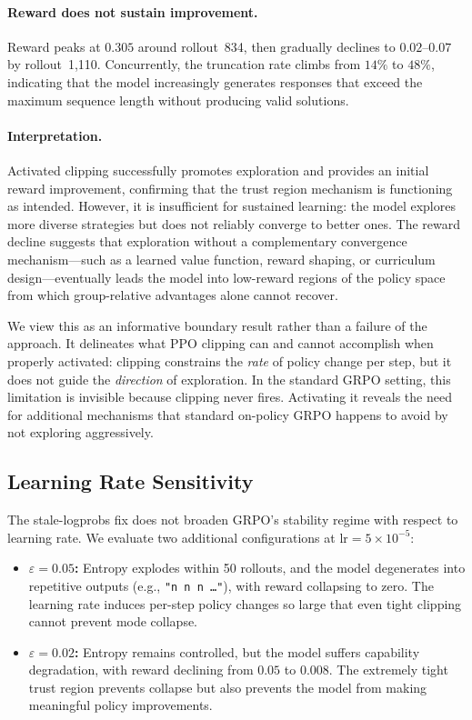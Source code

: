 \paragraph{Reward does not sustain improvement.}
Reward peaks at $0.305$ around rollout~834, then gradually declines to $0.02$--$0.07$ by rollout~1,110.
Concurrently, the truncation rate climbs from $14\%$ to $48\%$, indicating that the model increasingly generates responses that exceed the maximum sequence length without producing valid solutions.

\paragraph{Interpretation.}
Activated clipping successfully promotes exploration and provides an initial reward improvement, confirming that the trust region mechanism is functioning as intended.
However, it is insufficient for sustained learning: the model explores more diverse strategies but does not reliably converge to better ones.
The reward decline suggests that exploration without a complementary convergence mechanism---such as a learned value function, reward shaping, or curriculum design---eventually leads the model into low-reward regions of the policy space from which group-relative advantages alone cannot recover.

We view this as an informative boundary result rather than a failure of the approach.
It delineates what PPO clipping can and cannot accomplish when properly activated: clipping constrains the \emph{rate} of policy change per step, but it does not guide the \emph{direction} of exploration.
In the standard GRPO setting, this limitation is invisible because clipping never fires.
Activating it reveals the need for additional mechanisms that standard on-policy GRPO happens to avoid by not exploring aggressively.

\subsection{Learning Rate Sensitivity}
\label{sec:lr-sensitivity}

The stale-logprobs fix does not broaden GRPO's stability regime with respect to learning rate.
We evaluate two additional configurations at $\text{lr} = 5 \times 10^{-5}$:

\begin{itemize}
    \item \textbf{$\varepsilon = 0.05$:} Entropy explodes within 50 rollouts, and the model degenerates into repetitive outputs (e.g., \texttt{"n n n \ldots"}), with reward collapsing to zero.
    The learning rate induces per-step policy changes so large that even tight clipping cannot prevent mode collapse.

    \item \textbf{$\varepsilon = 0.02$:} Entropy remains controlled, but the model suffers capability degradation, with reward declining from $0.05$ to $0.008$.
    The extremely tight trust region prevents collapse but also prevents the model from making meaningful policy improvements.
\end{itemize}

